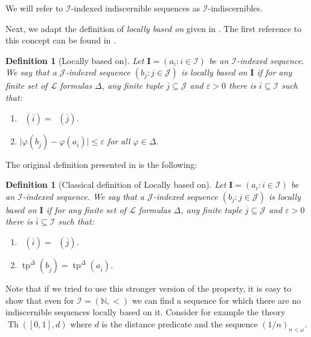 \documentclass{amsart}
\newtheorem{defin}[teor]{Definition}
\newtheorem{external claim}[teor]{Claim}
\newcommand{\mL}{\mathcal{L}}
\newcommand{\I}{\mathcal{I}}
\newcommand{\II}{\mathbf{I}}
\DeclareMathOperator{\tp}{{tp}}
\DeclareMathOperator{\qftp}{{tp^{qf}}}
\DeclareMathOperator{\Th}{{Th}}
\begin{document}
We will refer to $\I$-indexed indiscernible sequences as $\I$-indiscernibles.

Next, we adapt the definition of \emph{locally based on} given in \cite{10.1215/00294527-3132797}. The first reference to this concept can be found in \cite{MZiegler}.
 

\begin{defin}[Locally based on] 
Let $\II=(a_i:i\in \I)$ be an $\I$-indexed sequence. We say that a $\mathcal{J}$-indexed sequence $(b_j:j\in\mathcal{J})$ is \emph{locally based on $\II$} if for any finite set of $\mL$ formulas $\Delta$, any finite tuple $\overline{j}\subseteq \mathcal{J}$ and $\varepsilon>0$ there is $\overline{i}\subseteq \I$ such that:
\begin{enumerate}
    \item $\qftp(\overline{i})=\qftp(\overline{j})$.
    \item $\lvert \varphi(b_{\overline{j}})- \varphi(a_{\overline{i}}) \rvert\leq \varepsilon$ for all $\varphi\in \Delta$.
\end{enumerate}
\end{defin}

 The original definition presented in \cite[Definition 2.5]{10.1215/00294527-3132797} is the following:
 \begin{defin}[Classical definition of Locally based on]
Let $\II=(a_i:i\in \I)$ be an $\I$-indexed sequence. We say that a $\mathcal{J}$-indexed sequence $(b_j:j\in\mathcal{J})$ is \emph{locally based on $\II$} if for any finite set of $\mL$ formulas $\Delta$, any finite tuple $\overline{j}\subseteq \mathcal{J}$ and $\varepsilon>0$ there is $\overline{i}\subseteq \I$ such that:
\begin{enumerate}
    \item $\qftp(\overline{i})=\qftp(\overline{j})$.
    \item $\tp^{\Delta}(b_{\overline{j}})= \tp^{\Delta}(a_{\overline{i}})$.
\end{enumerate}
\end{defin}
 
 Note that if we tried to use this stronger version of the property, it is easy to show that even for $\I=(\mathbb{N},<)$ we can find a sequence for which there are no indiscernible sequences locally based on it. Consider for example the theory $\Th([0,1],d)$ where $d$ is the distance predicate and the sequence $(1/n)_{n<\omega}$.
\end{document}
